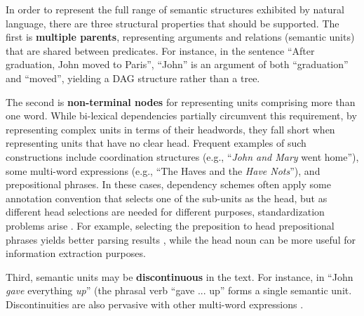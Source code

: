 \documentclass[12pt,a4paper]{report}
\begin{document}
In order to represent the full range of semantic structures exhibited by
natural language, there are three structural properties that should be supported.
The first is \textbf{multiple parents},
representing arguments and relations (semantic units) that are shared between predicates.
For instance, in the sentence
``After graduation, John moved to Paris'', ``John'' is an argument of both ``graduation''
and ``moved'', yielding a DAG structure rather than a tree.

The second is \textbf{non-terminal nodes} for representing units
comprising more than one word.
While bi-lexical dependencies partially circumvent this requirement, by
representing complex units in terms of their headwords, they fall short
when representing units that have no clear head.
Frequent examples of such constructions include
coordination structures (e.g., ``\textit{John and Mary} went home''),
some multi-word expressions (e.g., ``The Haves and the \textit{Have Nots}''),
and prepositional phrases.
In these cases, dependency schemes often apply some annotation convention that
selects one of the sub-units
as the head, but as different head selections are needed for different purposes,
standardization problems arise \cite{Ivanova2012who}.
For example, selecting the preposition to head prepositional phrases yields better
parsing results \cite{Schwartz:12}, while the head noun can be more useful for
information extraction purposes.

Third, semantic units may be \textbf{discontinuous} in the text. For instance, in
``John \textit{gave} everything \textit{up}''
(the phrasal verb ``gave ... up'' forms a single semantic unit.
Discontinuities are also pervasive with other multi-word
expressions \cite{schneider2014discriminative}.
\end{document}
